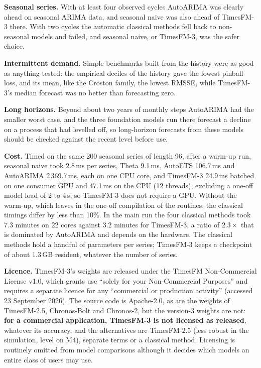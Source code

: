 \textbf{Seasonal series.} With at least four observed cycles AutoARIMA was clearly ahead on seasonal ARIMA
data, and seasonal naive was also ahead of TimesFM-3 there. With two cycles the automatic classical methods
fell back to non-seasonal models and failed, and seasonal naive, or TimesFM-3, was the safer choice.

\textbf{Intermittent demand.} Simple benchmarks built from the history were as good as anything tested: the
empirical deciles of the history gave the lowest pinball loss, and its mean, like the Croston family, the
lowest RMSSE, while TimesFM-3's median forecast was no better than forecasting zero.

\textbf{Long horizons.} Beyond about two years of monthly steps AutoARIMA had the smaller worst case, and the three foundation models run there forecast a decline on a process that had levelled off, so long-horizon forecasts from
these models should be checked against the recent level before use.

\textbf{Cost.} Timed on the same 200 seasonal series of length 96, after a warm-up run, seasonal naive
took 2.8\,ms per series, Theta 9.1\,ms, AutoETS 106.7\,ms and AutoARIMA 2\,369.7\,ms, each on one CPU core,
and TimesFM-3 24.9\,ms batched on one consumer GPU and 47.1\,ms on the CPU (12 threads), excluding a
one-off model load of 2 to 4\,s, so TimesFM-3 does not require a GPU. Without the warm-up, which leaves in
the one-off compilation of the  routines, the classical timings differ by less than
10\%. In the main run the four
classical methods took 7.3 minutes on 22 cores against 3.2 minutes for TimesFM-3, a ratio of $2.3\times$ that
is dominated by AutoARIMA and depends on the hardware. The classical methods hold a handful of parameters per
series; TimesFM-3 keeps a checkpoint of about 1.3\,GB resident, whatever the number of series.

\textbf{Licence.} TimesFM-3's weights are released under the TimesFM Non-Commercial License v1.0, which
grants use ``solely for your Non-Commercial Purposes'' and requires a separate licence for any ``commercial
or production activity'' \citep{timesfm3repo, timesfm3card} (accessed 23 September 2026). The source code is
Apache-2.0, as are the weights of TimesFM-2.5, Chronos-Bolt and Chronos-2, but the version-3 weights are not:
\textbf{for a commercial application, TimesFM-3 is not licensed as released}, whatever its accuracy, and the
alternatives are TimesFM-2.5 (less robust in the simulation, level on M4), separate terms or a classical
method. Licensing is routinely omitted from model comparisons although it decides which models an entire
class of users may use.

